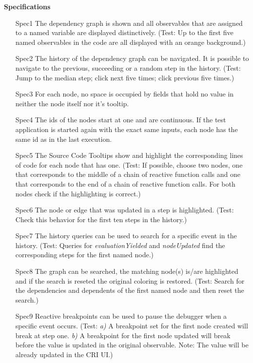 \textbf{Specifications}
\begin{itemize}
	\item[Spec1] The dependency graph is shown and all observables that are assigned to a named variable are displayed distinctively. (Test: Up to the first five named observables in the code are all displayed with an orange background.)
	\item[Spec2] The history of the dependency graph can be navigated. It is possible to navigate to the previous, succeeding or a random step in the history. (Test: Jump to the median step; click next five times; click previous five times.)
	\item[Spec3] For each node, no space is occupied by fields that hold no value in neither the node itself nor it's tooltip.
	\item[Spec4] The ids of the nodes start at one and are continuous. If the test application is started again with the exact same inputs, each node has the same id as in the last execution.
	\item[Spec5] The Source Code Tooltips show and highlight the corresponding lines of code for each node that has one. (Test: If possible, choose two nodes, one that corresponds to the middle of a chain of reactive function calls and one that corresponds to the end of a chain of reactive function calls. For both nodes check if the highlighting is correct.)
	\item[Spec6] The node or edge that was updated in a step is highlighted. (Test: Check this behavior for the first ten steps in the history.)
	\item[Spec7] The history queries can be used to search for a specific event in the history. (Test: Queries for \emph{evaluationYielded} and \emph{nodeUpdated} find the corresponding steps for the first named node.)
	\item[Spec8] The graph can be searched, the matching node(s) is/are highlighted and if the search is reseted the original coloring is restored. (Test: Search for the dependencies and dependents of the first named node and then reset the search.)
	\item[Spec9] Reactive breakpoints can be used to pause the debugger when a specific event occurs. (Test: \emph{a)} A breakpoint set for the first node created will break at step one. \emph{b)} A breakpoint for the first node updated will break before the value is updated in the original observable. Note: The value will be already updated in the CRI UI.)
\end{itemize}

